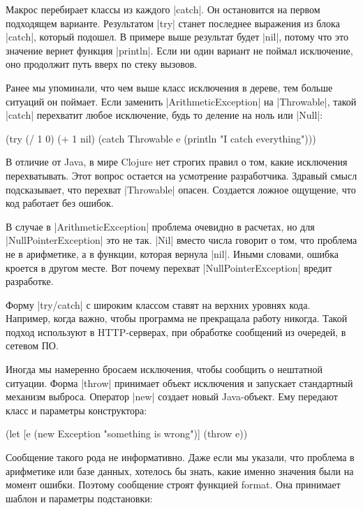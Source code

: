 Макрос перебирает классы из каждого \spverb|catch|. Он остановится на первом подходящем
варианте. Результатом \spverb|try| станет последнее выражения из блока \spverb|catch|, который
подошел. В примере выше результат будет \spverb|nil|, потому что это значение вернет
функция \spverb|println|. Если ни один вариант не поймал исключение, оно продолжит путь
вверх по стеку вызовов.

Ранее мы упоминали, что чем выше класс исключения в дереве, тем больше ситуаций
он поймает. Если заменить \spverb|ArithmeticException| на \spverb|Throwable|, такой \spverb|catch|
перехватит любое исключение, будь то деление на ноль или \spverb|Null|:

\begin{code}
(try
  (/ 1 0)
  (+ 1 nil)
  (catch Throwable e
    (println "I catch everything")))
\end{code}

В отличие от Java, в мире Clojure нет строгих правил о том, какие исключения
перехватывать. Этот вопрос остается на усмотрение разработчика. Здравый смысл
подсказывает, что перехват \spverb|Throwable| опасен. Создается ложное ощущение, что
код работает без ошибок.

В случае в \spverb|ArithmeticException| проблема очевидно в расчетах, но для
\spverb|NullPointerException| это не так. \spverb|Nil| вместо числа говорит о том, что
проблема не в арифметике, а в функции, которая вернула \spverb|nil|. Иными словами,
ошибка кроется в другом месте. Вот почему перехват \spverb|NullPointerException| вредит
разработке.

Форму \spverb|try/catch| с широким классом ставят на верхних уровнях кода. Например,
когда важно, чтобы программа не прекращала работу никогда. Такой подход
используют в HTTP-серверах, при обработке сообщений из очередей, в сетевом ПО.

Иногда мы намеренно бросаем исключения, чтобы сообщить о нештатной
ситуации. Форма \spverb|throw| принимает объект исключения и запускает стандартный
механизм выброса. Оператор \spverb|new| создает новый Java-объект. Ему передают класс и
параметры конструктора:

\begin{code}
(let [e (new Exception "something is wrong")]
  (throw e))
\end{code}

Сообщение такого рода не информативно. Даже если мы указали, что проблема в
арифметике или базе данных, хотелось бы знать, какие именно значения были на
момент ошибки. Поэтому сообщение строят функцией format. Она принимает шаблон и
параметры подстановки:

